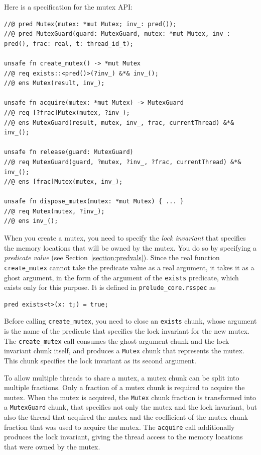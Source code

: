 \documentclass{article}
\begin{document}
Here is a specification for the mutex API:
\begin{lstlisting}
//@ pred Mutex(mutex: *mut Mutex; inv_: pred());
//@ pred MutexGuard(guard: MutexGuard, mutex: *mut Mutex, inv_: pred(), frac: real, t: thread_id_t);

unsafe fn create_mutex() -> *mut Mutex
//@ req exists::<pred()>(?inv_) &*& inv_();
//@ ens Mutex(result, inv_);

unsafe fn acquire(mutex: *mut Mutex) -> MutexGuard
//@ req [?frac]Mutex(mutex, ?inv_);
//@ ens MutexGuard(result, mutex, inv_, frac, currentThread) &*& inv_();

unsafe fn release(guard: MutexGuard)
//@ req MutexGuard(guard, ?mutex, ?inv_, ?frac, currentThread) &*& inv_();
//@ ens [frac]Mutex(mutex, inv_);

unsafe fn dispose_mutex(mutex: *mut Mutex) { ... }
//@ req Mutex(mutex, ?inv_);
//@ ens inv_();
\end{lstlisting}

When you create a mutex, you need to specify the \emph{lock
invariant} that specifies the memory locations that will be
owned by the mutex. You do so by specifying a \emph{predicate
value} (see Section~\ref{section:predvals}). Since the real
function \lstinline!create_mutex! cannot take the predicate
value as a real argument, it takes it as a ghost argument, in
the form of the argument of the
\lstinline!exists! predicate, which exists only
for this purpose. It is defined in \verb|prelude_core.rsspec| as
\begin{lstlisting}
pred exists<t>(x: t;) = true;
\end{lstlisting}
Before calling
\lstinline!create_mutex!, you need to close an
\lstinline!exists! chunk, whose argument is the
name of the predicate that specifies the lock invariant for the
new mutex. The \lstinline!create_mutex! call consumes the ghost
argument chunk and the lock invariant chunk itself, and
produces a \lstinline!Mutex! chunk that represents the mutex.
This chunk specifies the lock invariant as its second argument.

To allow multiple threads to share a mutex, a mutex chunk can
be split into multiple fractions. Only a fraction of a mutex
chunk is required to acquire the mutex. When the mutex is
acquired, the \lstinline!Mutex! chunk fraction is transformed
into a \lstinline!MutexGuard! chunk, that specifies not only
the mutex and the lock invariant, but also the thread that
acquired the mutex and the coefficient of the mutex chunk
fraction that was used to acquire the mutex. The
\lstinline!acquire! call additionally produces the lock
invariant, giving the thread access to the memory locations
that were owned by the mutex.
\end{document}

